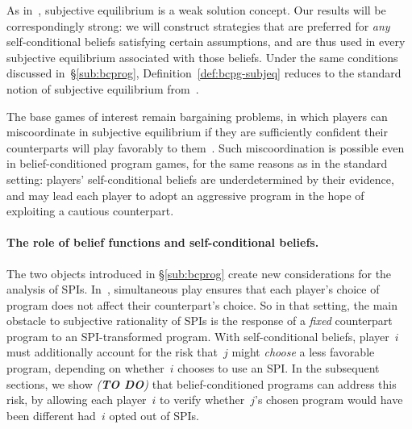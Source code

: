 \documentclass[sigconf]{aamas}
\theoremstyle{definition}
\begin{document}
As in~\citet{digiovanni2024safe}, subjective equilibrium is a weak solution concept.
Our results will be correspondingly strong: we will construct strategies that are preferred for \emph{any} self-conditional beliefs satisfying certain assumptions, and are thus used in every subjective equilibrium associated with those beliefs. Under the same conditions discussed in~\S\ref{sub:bcprog}, Definition~\ref{def:bcpg-subjeq} reduces to the standard notion of subjective equilibrium from~\citet{digiovanni2024safe}.

The base games of interest remain bargaining problems, in which players can miscoordinate in subjective equilibrium if they are sufficiently confident their counterparts will play favorably to them~\citep[Example~1]{digiovanni2024safe}.
Such miscoordination is possible even in belief-conditioned program games, for the same reasons as in the standard setting: players' self-conditional beliefs are underdetermined by their evidence, and may lead each player to adopt an aggressive program in the hope of exploiting a cautious counterpart.

\paragraph{The role of belief functions and self-conditional beliefs.}
The two objects introduced in \S\ref{sub:bcprog} create new considerations for the analysis of SPIs.
In~\citet{digiovanni2024safe}, simultaneous play ensures that each player's choice of program does not affect their counterpart's choice.
So in that setting, the main obstacle to subjective rationality of SPIs is the response of a \emph{fixed} counterpart program to an SPI-transformed program.
With self-conditional beliefs, player~$i$ must additionally account for the risk that~$j$ might \emph{choose} a less favorable program, depending on whether~$i$ chooses to use an SPI.
In the subsequent sections, we show \textit{(\textbf{TO DO})} that belief-conditioned programs can address this risk, by allowing each player~$i$ to verify whether~$j$'s chosen program would have been different had~$i$ opted out of SPIs.
\end{document}
